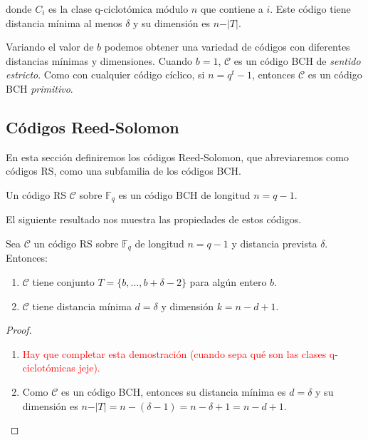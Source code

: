 donde $C_i$ es la clase q-ciclotómica módulo $n$ que contiene a $i$. Este código tiene distancia mínima al menos $\delta$ y su dimensión es $n - \vert T \vert$.


Variando el valor de $b$ podemos obtener una variedad de códigos con diferentes distancias mínimas y dimensiones. Cuando $b = 1$, $\mathcal{C}$ es un código BCH de \emph{sentido estricto}. Como con cualquier código cíclico, si $n = q^t - 1$, entonces $\mathcal{C}$ es un código BCH \emph{primitivo}.

\subsection{Códigos Reed-Solomon}

En esta sección definiremos los códigos Reed-Solomon, que abreviaremos como códigos RS, como una subfamilia de los códigos BCH.

\begin{definition}
    Un código RS $\mathcal{C}$ sobre $\mathbb{F}_q$ es un código BCH de longitud $n = q - 1$.
\end{definition}

El siguiente resultado nos muestra las propiedades de estos códigos.

\begin{theorem}
    Sea $\mathcal{C}$ un código RS sobre $\mathbb{F}_q$ de longitud $n = q - 1$ y distancia prevista $\delta$. Entonces:

    \begin{enumerate}
        \item $\mathcal{C}$ tiene conjunto $T = \{ b, ..., b + \delta - 2 \}$ para algún entero $b$.
        \item $\mathcal{C}$ tiene distancia mínima $d = \delta$ y dimensión $k = n - d + 1$.
    \end{enumerate}
\end{theorem}

\begin{proof}
    \begin{enumerate}
        \item \textcolor{red}{Hay que completar esta demostración (cuando sepa qué son las clases q-ciclotómicas jeje).}
        \item Como $\mathcal{C}$ es un código BCH, entonces su distancia mínima es $d = \delta$ y su dimensión es $n - \vert T \vert = n - (\delta - 1) = n - \delta + 1 = n - d + 1$.
    \end{enumerate}
\end{proof}


